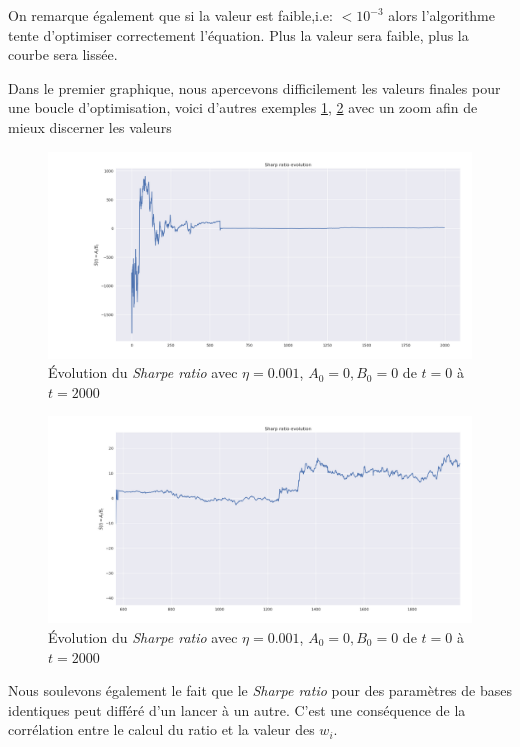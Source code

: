 \documentclass[a4paper, 11pt]{article}
\begin{document}
 On remarque également que si la valeur est faible,i.e: $< 10^{-3}$ alors l'algorithme tente d'optimiser correctement l'équation. Plus la valeur sera faible,
 plus la courbe sera lissée.
 
 Dans le premier graphique, nous apercevons difficilement les valeurs finales pour une boucle d'optimisation, voici d'autres exemples \ref{sharpe ratio eta=0.001 zoomé}, \ref{sharpe ratio eta=0.001 zoomé 2} avec un zoom afin de mieux discerner les valeurs
 \begin{figure}[H]
 	\centering
 	\includegraphics[scale=0.35]{res/Sharpe_ratio_evolution_big}
 	\caption{Évolution du \textit{Sharpe ratio} avec $\eta = 0.001$, $A_0 = 0, B_0 = 0$ de $t=0$ à $t=2000$}
  	\label{sharpe ratio eta=0.001 zoomé}
 \end{figure} 
 
 \begin{figure}[H]
 	\centering
 	\includegraphics[scale=0.35]{res/Sharpe_ratio_evolution_small}
 	\caption{Évolution du \textit{Sharpe ratio} avec $\eta = 0.001$, $A_0 = 0, B_0 = 0$ de $t=0$ à $t=2000$}
  	\label{sharpe ratio eta=0.001 zoomé 2}
 \end{figure} 
 
 Nous soulevons également le fait que le \textit{Sharpe ratio} pour des paramètres de bases identiques peut différé d'un lancer à un autre. C'est une conséquence de la corrélation entre le calcul du ratio et la valeur des $w_i$.
 
\end{document}
